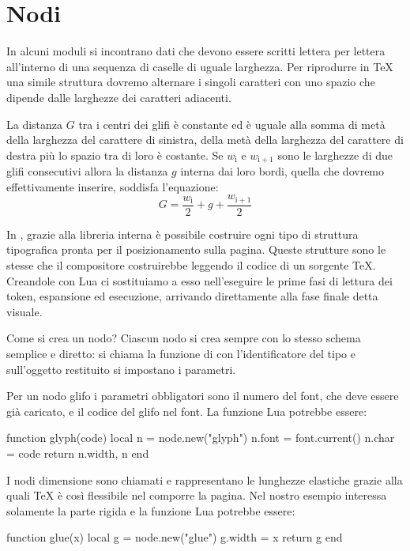 

\chapter{Nodi}
\label{iiiChNodi}

In alcuni moduli si incontrano dati che devono essere scritti lettera per
lettera all'interno di una sequenza di caselle di uguale larghezza. Per
riprodurre in \TeX{} una simile struttura dovremo alternare i singoli caratteri
con uno spazio che dipende dalle larghezze dei caratteri adiacenti.

La distanza \( G \) tra i centri dei glifi è constante ed è uguale alla somma di
metà della larghezza del carattere di sinistra, della metà della larghezza del
carattere di destra più lo spazio tra di loro è costante. Se \(w_\mathrm{i} \) e
\(w_\mathrm{i+1} \) sono le larghezze di due glifi consecutivi allora la
distanza \( g \) interna dai loro bordi, quella che dovremo effettivamente
inserire, soddisfa l'equazione:
\[
    G = \frac{w_\mathrm{i}}{2} + g + \frac{w_\mathrm{i+1}}{2}
\]

In \LuaTeX, grazie alla libreria interna  è possibile costruire ogni
tipo di struttura tipografica pronta per il posizionamento sulla pagina. Queste
strutture sono le stesse che il compositore costruirebbe leggendo il codice di
un sorgente \TeX{}. Creandole con Lua ci sostituiamo a esso nell'eseguire le
prime fasi di lettura dei token, espansione ed esecuzione, arrivando
direttamente alla fase finale detta visuale.

Come si crea un nodo? Ciascun nodo si crea sempre con lo stesso schema semplice
e diretto: si chiama la funzione  di  con l'identificatore
del tipo e sull'oggetto restituito si impostano i parametri.

Per un nodo glifo i parametri obbligatori sono il numero del font, che deve
essere già caricato, e il codice del glifo nel font. La funzione Lua potrebbe
essere:
\begin{lines}
function glyph(code)
    local n = node.new("glyph")
    n.font = font.current()
    n.char = code
    return n.width, n
end
\end{lines}

I nodi dimensione sono chiamati  e rappresentano le lunghezze
elastiche grazie alla quali \TeX{} è così flessibile nel comporre la pagina. Nel
nostro esempio interessa solamente la parte rigida e la funzione Lua potrebbe
essere:
\begin{lines}
function glue(x)
    local g = node.new("glue")
    g.width = x
    return g
end
\end{lines}

